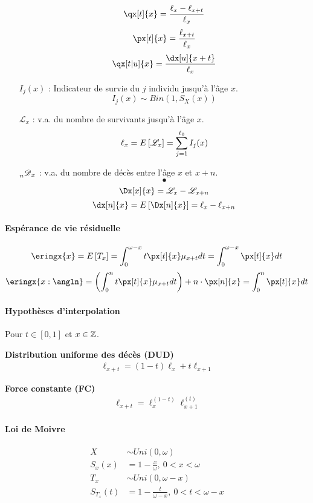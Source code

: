 \documentclass[10pt, french]{article}
\begin{document}
\begin{multicols*}{3}
\begin{itemize}
\[\qx[t]{x} = \frac{\ell_x - \ell_{x+t}}{\ell_x}\]
\[\px[t]{x} = \frac{\ell_{x+t}}{\ell_x} \]
\[\qx[t|u]{x} = \frac{\dx[u]{x+t}}{\ell_x}\]

\item[$I_j(x)$ : ] Indicateur de survie du $j$ individu jusqu'à l'âge $x$.
\[I_j(x) \sim Bin(1, S_X(x))\]
\item[$\mathscr{L}_x$ : ] v.a. du nombre de survivants jusqu'à l'âge $x$.
\[\ell_x = E \left[ \mathscr{L}_x \right] = \sum_{j=1}^{\ell_0} I_j(x)\]

\item[$\prescript{}{n}{\mathscr{D}}_x$ : ] v.a. du nombre de décès entre l'âge $x$ et $x+n$.
\[•\]
\[\Dx[x]{x} = \mathscr{L}_x - \mathscr{L}_{x+n}\]
\[\dx[n]{x} = \esp{\Dx[n]{x}} = \ell_{x} - \ell_{x+n} \]
\end{itemize}
\paragraph{Espérance de vie résiduelle}
\[\eringx{x} = \esp{T_x} =  \int_{0}^{\omega - x} t \px[t]{x} \mu_{x+t} dt= \int_{0}^{\omega - x} \px[t]{x} dt \]
\[\eringx{x:\angln} = \left( \int_{0}^{n} t \px[t]{x} \mu_{x+t} dt   \right) + n \cdot \px[n]{x} = \int_{0}^{n} \px[t]{x} dt \]


\paragraph{Hypothèses d'interpolation}
Pour $t \in [0,1]$ et $x \in \mathbb{Z}$.

\textbf{Distribution uniforme des décès (DUD)}
\begin{align*}
\ell_{x+t} = (1-t) \ell_x + t \ell_{x+1}
\end{align*}

\textbf{Force constante (FC)}
\begin{align*}
\ell_{x+t} = \ell_x^{(1-t)} \ell_{x+1}^{(t)}
\end{align*}

\paragraph{Loi de Moivre}
\begin{align*}
	X &\sim Uni(0, \omega) \\
	S_x(x) &= 1 - \frac{x}{\omega},\: 0 < x < \omega \\
	T_x &\sim Uni(0, \omega - x) \\
	S_{T_x}(t) &= 1 - \frac{t}{\omega - x},\: 0 < t < \omega - x
\end{align*}


\end{multicols*}
\end{document}
